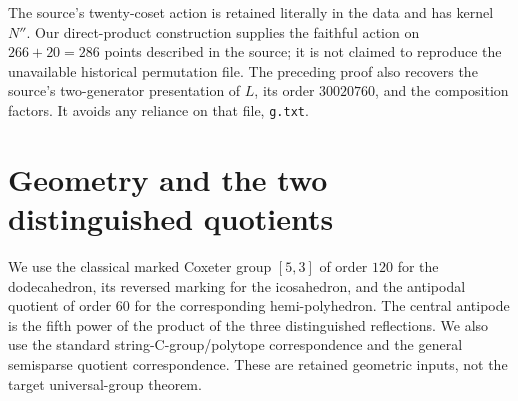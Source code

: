 \documentclass[11pt,a4paper]{article}
\begin{document}
The source's twenty-coset action is retained literally in the data and has kernel $N''$. Our direct-product construction supplies the faithful action on $266+20=286$ points described in the source; it is not claimed to reproduce the unavailable historical permutation file. The preceding proof also recovers the source's two-generator presentation of $L$, its order $30020760$, and the composition factors. It avoids any reliance on that file, \texttt{g.txt}.

\section{Geometry and the two distinguished quotients}
We use the classical marked Coxeter group $[5,3]$ of order $120$ for the dodecahedron, its reversed marking for the icosahedron, and the antipodal quotient of order $60$ for the corresponding hemi-polyhedron. The central antipode is the fifth power of the product of the three distinguished reflections. We also use the standard string-C-group/polytope correspondence and the general semisparse quotient correspondence. These are retained geometric inputs, not the target universal-group theorem.
\end{document}
